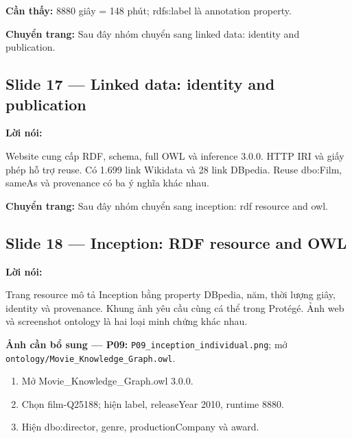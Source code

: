 \documentclass[
  11pt,
]{article}
\providecommand{\tightlist}{%
  \setlength{\itemsep}{0pt}\setlength{\parskip}{0pt}}
\begin{document}
\textbf{Cần thấy:} 8880 giây = 148 phút; rdfs:label là annotation
property.

\textbf{Chuyển trang:} Sau đây nhóm chuyển sang linked data: identity
and publication.

\subsection{Slide 17 --- Linked data: identity and
publication}\label{slide-17-linked-data-identity-and-publication}

\textbf{Lời nói:}

Website cung cấp RDF, schema, full OWL và inference 3.0.0. HTTP IRI và
giấy phép hỗ trợ reuse. Có 1.699 link Wikidata và 28 link DBpedia. Reuse
dbo:Film, sameAs và provenance có ba ý nghĩa khác nhau.

\textbf{Chuyển trang:} Sau đây nhóm chuyển sang inception: rdf resource
and owl.

\subsection{Slide 18 --- Inception: RDF resource and
OWL}\label{slide-18-inception-rdf-resource-and-owl}

\textbf{Lời nói:}

Trang resource mô tả Inception bằng property DBpedia, năm, thời lượng
giây, identity và provenance. Khung ảnh yêu cầu cùng cá thể trong
Protégé. Ảnh web và screenshot ontology là hai loại minh chứng khác
nhau.

\textbf{Ảnh cần bổ sung --- P09:}
\texttt{P09\_\allowbreak{}ince\allowbreak{}ption\_\allowbreak{}in\allowbreak{}dividual\allowbreak{}.\allowbreak{}png};
mở
\texttt{ontology\allowbreak{}/\allowbreak{}\allowbreak{}Movie\_\allowbreak{}\allowbreak{}K\allowbreak{}nowledge\allowbreak{}\_\allowbreak{}\allowbreak{}Graph.\allowbreak{}o\allowbreak{}wl}.

\begin{enumerate}
\def\labelenumi{\arabic{enumi}.}
\tightlist
\item
  Mở
  Movie\_\allowbreak{}\allowbreak{}Kn\allowbreak{}owledge\_\allowbreak{}\allowbreak{}Graph.\allowbreak{}ow\allowbreak{}l
  3.0.0.
\item
  Chọn film-Q25188; hiện label, releaseYear 2010, runtime 8880.
\item
  Hiện dbo:\allowbreak{}dire\allowbreak{}ctor, genre,
  producti\allowbreak{}on\allowbreak{}Compan\allowbreak{}y và award.
\end{enumerate}
\end{document}

